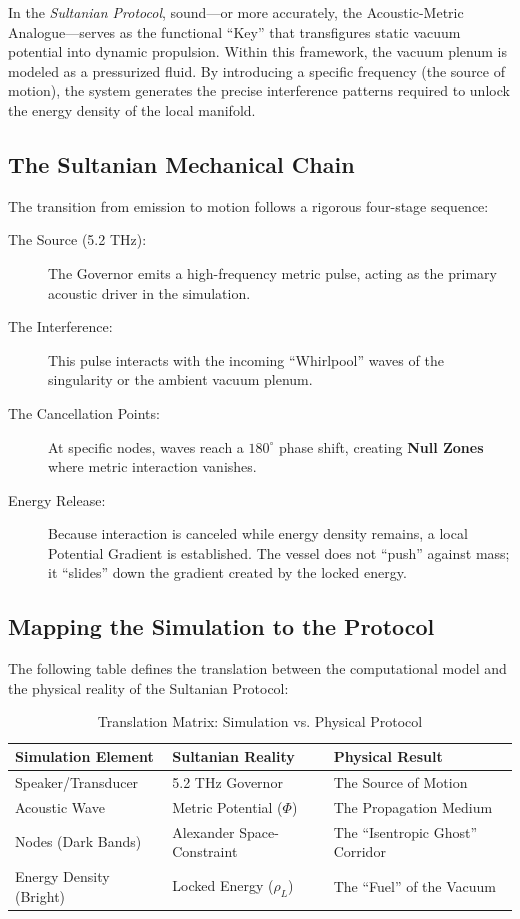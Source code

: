 \documentclass[11pt,a4paper]{article}
\begin{document}
In the \textit{Sultanian Protocol}, sound---or more accurately, the Acoustic-Metric Analogue---serves as the functional ``Key'' that transfigures static vacuum potential into dynamic propulsion. Within this framework, the vacuum plenum is modeled as a pressurized fluid. By introducing a specific frequency (the source of motion), the system generates the precise interference patterns required to unlock the energy density of the local manifold.

\subsection{The Sultanian Mechanical Chain}
The transition from emission to motion follows a rigorous four-stage sequence:

\begin{description}
    \item[The Source (5.2 THz):] The Governor emits a high-frequency metric pulse, acting as the primary acoustic driver in the simulation.
    \item[The Interference:] This pulse interacts with the incoming ``Whirlpool'' waves of the singularity or the ambient vacuum plenum.
    \item[The Cancellation Points:] At specific nodes, waves reach a $180^\circ$ phase shift, creating \textbf{Null Zones} where metric interaction vanishes.
    \item[Energy Release:] Because interaction is canceled while energy density remains, a local Potential Gradient is established. The vessel does not ``push'' against mass; it ``slides'' down the gradient created by the locked energy.
\end{description}

\subsection{Mapping the Simulation to the Protocol}
The following table defines the translation between the computational model and the physical reality of the Sultanian Protocol:

\begin{table}[htbp]
\centering
\begin{tabular}{|l|l|l|}
\hline
\textbf{Simulation Element} & \textbf{Sultanian Reality} & \textbf{Physical Result} \\ \hline
Speaker/Transducer & 5.2 THz Governor & The Source of Motion \\ \hline
Acoustic Wave & Metric Potential ($\Phi$) & The Propagation Medium \\ \hline
Nodes (Dark Bands) & Alexander Space-Constraint & The ``Isentropic Ghost'' Corridor \\ \hline
Energy Density (Bright) & Locked Energy ($\rho_L$) & The ``Fuel'' of the Vacuum \\ \hline
\end{tabular}
\caption{Translation Matrix: Simulation vs. Physical Protocol}
\label{table:mapping}
\end{table}
\end{document}

